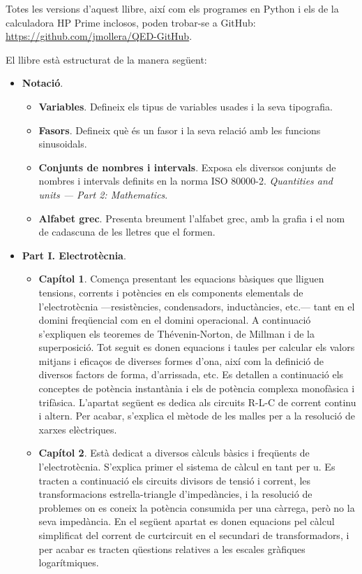      Totes les versions d'aquest llibre, així com els programes en Python i els de la calculadora \textsf{HP Prime} inclosos, poden trobar-se a GitHub: \href{https://github.com/jmollera/QED-GitHub}{https:/\!\!/github.com/jmollera/QED-GitHub}.

	El llibre està estructurat de la manera següent:
	\begin{itemize}
		\item \textbf{Notació}.
		\begin{itemize}
			\item \textbf{Variables}. Defineix els tipus de variables usades i la seva tipografia.
			\item \textbf{Fasors}. Defineix què és un fasor i la seva relació amb les funcions sinusoidals.
			\item \textbf{Conjunts de nombres i intervals}. Exposa  els diversos conjunts de nombres i  intervals definits en la norma ISO 80000-2.
			\textit{Quantities and units --- Part 2: Mathematics}.
			\item \textbf{Alfabet grec}.  Presenta breument l'alfabet grec, amb la grafia i el nom de cadascuna de les lletres que el formen.
		\end{itemize}
		\item \textbf{Part I. Electrotècnia}. 
		\begin{itemize}
			\item \textbf{Capítol 1}. Comença presentant les equacions bàsiques que lliguen tensions, corrents i potències en els components elementals de l'electrotècnia ---resistències, condensadors, inductàncies, etc.--- tant en el domini freqüencial com en el domini operacional. A continuació s'expliquen els teoremes de Thévenin-Norton, de Millman i de la superposició. Tot seguit es donen equacions i taules per calcular els valors mitjans i eficaços de diverses formes d'ona, així com la definició de diversos factors de forma, d'arrissada, etc. Es detallen a continuació els conceptes de potència instantània i els de potència complexa monofàsica i trifàsica. L'apartat següent es dedica  als circuits R-L-C de corrent continu i altern. Per acabar, s'explica el mètode de les malles per a la resolució de xarxes elèctriques.
			\item \textbf{Capítol 2}. Està dedicat a diversos càlculs bàsics i freqüents de l'electrotècnia. S'explica primer el sistema de càlcul en tant per u. Es tracten a continuació els circuits  divisors de tensió i corrent,  les transformacions estrella-triangle d'impedàncies, i la resolució de problemes on es coneix la potència consumida per una càrrega, però no la seva impedància. En el següent apartat es donen equacions pel càlcul simplificat del corrent de curtcircuit en el secundari de transformadors, i per acabar es tracten  qüestions relatives a les  escales gràfiques logarítmiques.

\end{itemize}
\end{itemize}

